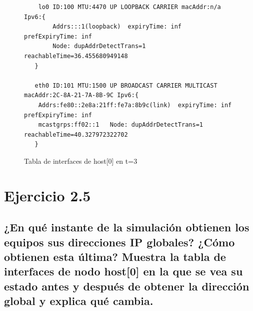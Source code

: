 \begin{figure}[H]
    \centering
    \begin{lstlisting}
    lo0 ID:100 MTU:4470 UP LOOPBACK CARRIER macAddr:n/a Ipv6:{
	    Addrs:::1(loopback)  expiryTime: inf prefExpiryTime: inf
 	    Node: dupAddrDetectTrans=1 reachableTime=36.455680949148
   }

   eth0 ID:101 MTU:1500 UP BROADCAST CARRIER MULTICAST macAddr:2C-8A-21-7A-8B-9C Ipv6:{
	Addrs:fe80::2e8a:21ff:fe7a:8b9c(link)  expiryTime: inf prefExpiryTime: inf
	mcastgrps:ff02::1 	Node: dupAddrDetectTrans=1 reachableTime=40.327972322702
   }
    \end{lstlisting}
    \caption{Tabla de interfaces de host[0] en t=3}
    \label{fig:InterfaceTablePostDAD}
\end{figure}

\section{Ejercicio 2.5}
\subsection{¿En qué instante de la simulación obtienen los equipos sus direcciones IP globales? ¿Cómo obtienen esta
última? Muestra la tabla de interfaces de nodo host[0] en la que se vea su estado antes y después de obtener la
dirección global y explica qué cambia.}


